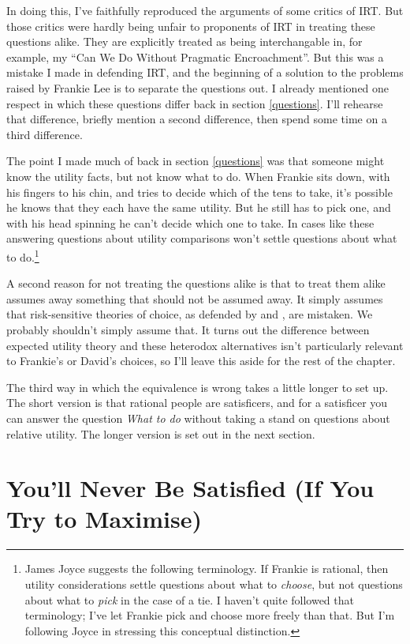 \documentclass[
  11pt,
]{book}
\begin{document}
In doing this, I've faithfully reproduced the arguments of some critics of IRT. But those critics were hardly being unfair to proponents of IRT in treating these questions alike. They are explicitly treated as being interchangable in, for example, my ``Can We Do Without Pragmatic Encroachment''. But this was a mistake I made in defending IRT, and the beginning of a solution to the problems raised by Frankie Lee is to separate the questions out. I already mentioned one respect in which these questions differ back in section \ref{questions}. I'll rehearse that difference, briefly mention a second difference, then spend some time on a third difference.

The point I made much of back in section \ref{questions} was that someone might know the utility facts, but not know what to do. When Frankie sits down, with his fingers to his chin, and tries to decide which of the tens to take, it's possible he knows that they each have the same utility. But he still has to pick one, and with his head spinning he can't decide which one to take. In cases like these answering questions about utility comparisons won't settle questions about what to do.\footnote{James Joyce \citeyearpar{Joyce2018} suggests the following terminology. If Frankie is rational, then utility considerations settle questions about what to \emph{choose}, but not questions about what to \emph{pick} in the case of a tie. I haven't quite followed that terminology; I've let Frankie pick and choose more freely than that. But I'm following Joyce in stressing this conceptual distinction.}

A second reason for not treating the questions alike is that to treat them alike assumes away something that should not be assumed away. It simply assumes that risk-sensitive theories of choice, as defended by \citet{Quiggin1982} and \citet{BuchakRisk}, are mistaken. We probably shouldn't simply assume that. It turns out the difference between expected utility theory and these heterodox alternatives isn't particularly relevant to Frankie's or David's choices, so I'll leave this aside for the rest of the chapter.

The third way in which the equivalence is wrong takes a little longer to set up. The short version is that rational people are satisficers, and for a satisficer you can answer the question \emph{What to do} without taking a stand on questions about relative utility. The longer version is set out in the next section.

\hypertarget{satisfied}{%
\section{You'll Never Be Satisfied (If You Try to Maximise)}\label{satisfied}}
\end{document}
